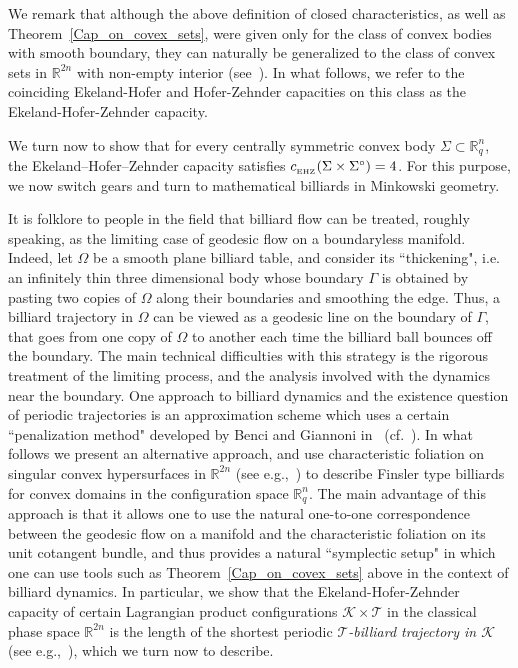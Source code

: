 \documentclass{icmart}
\theoremstyle{definition}
\begin{document}
We remark that although the above definition of closed characteristics, as well as Theorem~\ref{Cap_on_covex_sets}, 
were given only for the class of convex bodies with smooth boundary, they can naturally be generalized 
to the class of convex sets in ${\mathbb R}^{2n}$ with non-empty interior  (see~\cite{AAO1}). In what follows, we
refer to the coinciding Ekeland-Hofer and Hofer-Zehnder capacities on this class as the Ekeland-Hofer-Zehnder capacity. %

\smallskip

We turn now to show that for every centrally symmetric convex body $\Sigma \subset {\mathbb R}^n_q$, the Ekeland--Hofer--Zehnder capacity satisfies $c_{_{\rm EHZ}} (\Sigma \times \Sigma^{\circ})=4$.
For this purpose, we now switch gears and turn to mathematical billiards in Minkowski geometry. 

\smallskip


It is  folklore to people in the field that billiard flow can be treated, roughly speaking, as the limiting case of geodesic flow on a boundaryless manifold. 
Indeed, 
%
let $\Omega$ be a smooth plane billiard table, and consider its ``thickening", i.e. an infinitely thin three
dimensional body whose boundary $\Gamma$ is obtained by pasting two copies of $\Omega$ along their boundaries
and smoothing the edge. Thus, a billiard trajectory in $\Omega$ can be viewed as a geodesic line on
the boundary of $\Gamma$, that goes from one copy of $\Omega$ to another each time the billiard ball bounces off the boundary. 
The main technical difficulties  with this strategy is the rigorous treatment of the limiting process, and the analysis involved with the dynamics near the  boundary. 
One approach to  billiard dynamics and the existence question of periodic trajectories is an  approximation scheme which uses a certain ``penalization method"  developed by Benci and  Giannoni in~\cite{BG} (cf.~\cite{AM,IrieKei2}).
In what follows we present an alternative approach, and use characteristic foliation on singular  convex hypersurfaces in ${\mathbb R}^{2n}$ (see e.g.,~\cite{Cl,Eke,Kun}) to describe Finsler type billiards for convex domains in the configuration space ${\mathbb R}^n_q$.
The main advantage of this approach is that it allows one to use the natural one-to-one correspondence between the geodesic flow on a manifold  and the characteristic foliation on its unit cotangent bundle, and thus provides a natural  ``symplectic setup"  in which one can use tools 
such as Theorem~\ref{Cap_on_covex_sets} above in the context of billiard dynamics.  In particular, we show that the Ekeland-Hofer-Zehnder capacity of certain Lagrangian product configurations ${\mathcal K} \times {\mathcal T}$ in the classical phase space ${\mathbb R}^{2n}$  is the length of the shortest periodic  {\it  ${\mathcal T}$-billiard trajectory in ${\mathcal K}$} (see e.g.,~\cite{AAO1,V}), which we turn now to describe.
\end{document}
